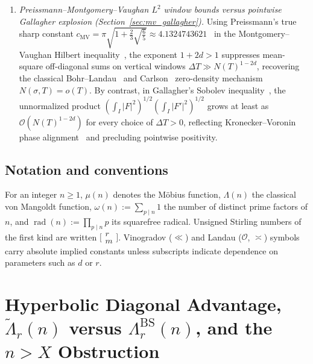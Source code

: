 \documentclass[11pt,reqno]{amsart}
\theoremstyle{definition}
\theoremstyle{remark}
\numberwithin{equation}{section}
\DeclareMathOperator{\rad}{rad}
\begin{document}
\begin{enumerate}[label=\textup{(\arabic*)},leftmargin=2.2em]
\item \textit{Preissmann--Montgomery--Vaughan $L^2$ window bounds versus pointwise Gallagher explosion (Section~\ref{sec:mv_gallagher}).} Using Preissmann's true sharp constant $c_{\mathrm{MV}} = \pi\sqrt{1 + \frac{2}{3}\sqrt{\frac{6}{5}}} \approx 4.1324743621$~\cite{preissmann1984} in the Montgomery--Vaughan Hilbert inequality~\cite{montgomeryvaughan1974}, the exponent $1 + 2d > 1$ suppresses mean-square off-diagonal sums on vertical windows $\Delta T \gg N(T)^{1-2d}$, recovering the classical Bohr--Landau~\cite{bohrlandau1914} and Carlson~\cite{carlson1920} zero-density mechanism $N(\sigma, T) = o(T)$. By contrast, in Gallagher's Sobolev inequality~\cite{gallagher1970}, the unnormalized product $(\int_I \lvert F\rvert^2)^{1/2}(\int_I \lvert F'\rvert^2)^{1/2}$ grows at least as $\mathcal{O}(N(T)^{1-2d})$ for every choice of $\Delta T > 0$, reflecting Kronecker--Voronin phase alignment~\cite{voronin1975} and precluding pointwise positivity.
\end{enumerate}

\subsection{Notation and conventions}\label{subsec:notation}

For an integer $n \ge 1$, $\mu(n)$ denotes the M\"obius function, $\Lambda(n)$ the classical von Mangoldt function, $\omega(n) := \sum_{p \mid n} 1$ the number of distinct prime factors of $n$, and $\rad(n) := \prod_{p \mid n} p$ its squarefree radical. Unsigned Stirling numbers of the first kind are written $\bigl[\begin{smallmatrix} r \\ m \end{smallmatrix}\bigr]$. Vinogradov ($\ll$) and Landau ($\mathcal{O}$, $\asymp$) symbols carry absolute implied constants unless subscripts indicate dependence on parameters such as $d$ or $r$.

\section{Hyperbolic Diagonal Advantage, $\widetilde{\Lambda}_r(n)$ versus $\Lambda_r^{\mathrm{BS}}(n)$, and the $n > X$ Obstruction}\label{sec:sieve_functions}
\end{document}
